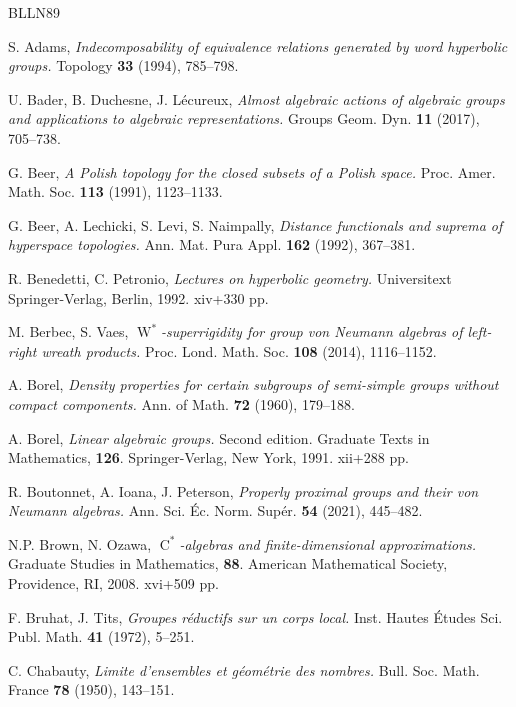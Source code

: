 \documentclass[11pt]{amsart}
\numberwithin{equation}{section}
\theoremstyle{plain}
\theoremstyle{definition}
\newcommand{\rW}{\operatorname{W}}
\newcommand{\rC}{\operatorname{C}}
\begin{document}
\begin{thebibliography}{BLLN89}

 {\sc S. Adams}, {\it Indecomposability of equivalence relations generated by word hyperbolic groups.} Topology {\bf 33} (1994), 785--798.

 {\sc U. Bader, B. Duchesne, J. L\'ecureux}, {\it Almost algebraic actions of algebraic groups and applications to algebraic representations.} Groups Geom. Dyn. {\bf 11} (2017), 705--738. 

 {\sc G. Beer}, {\it A Polish topology for the closed subsets of a Polish space.} Proc. Amer. Math. Soc. {\bf 113} (1991), 1123--1133.

 {\sc G. Beer, A. Lechicki, S. Levi, S. Naimpally}, {\it Distance functionals and suprema of hyperspace topologies.} Ann. Mat. Pura Appl. {\bf 162} (1992), 367--381.

 {\sc R. Benedetti, C. Petronio}, {\it Lectures on hyperbolic geometry.} Universitext Springer-Verlag, Berlin, 1992. xiv+330 pp.

 {\sc M. Berbec, S. Vaes}, {\it $\rW^*$-superrigidity for group von Neumann algebras of left-right wreath products.} Proc. Lond. Math. Soc. {\bf 108} (2014), 1116--1152.

 {\sc A. Borel}, {\it Density properties for certain subgroups of semi-simple groups without compact components.} Ann. of Math. {\bf 72} (1960), 179--188.

 {\sc A. Borel}, {\it Linear algebraic groups.} Second edition. Graduate Texts in Mathematics, {\bf 126}. Springer-Verlag, New York, 1991. xii+288 pp. 

 {\sc R. Boutonnet, A. Ioana, J. Peterson}, {\it Properly proximal groups and their von Neumann algebras.} Ann. Sci. \'Ec. Norm. Supér. {\bf 54} (2021), 445--482.

 {\sc N.P. Brown, N. Ozawa}, {\it $\rC^*$-algebras and finite-dimensional approximations.} Graduate Studies in Mathematics, {\bf 88}. American Mathematical Society, Providence, RI, 2008. xvi+509 pp.

 {\sc F. Bruhat, J. Tits}, {\it Groupes r\'eductifs sur un corps local.} Inst. Hautes \'Etudes Sci. Publ. Math. {\bf 41} (1972), 5–251.

 {\sc C. Chabauty}, {\it Limite d'ensembles et géométrie des nombres.} Bull. Soc. Math. France {\bf 78} (1950), 143--151.


\end{thebibliography}
\end{document}
